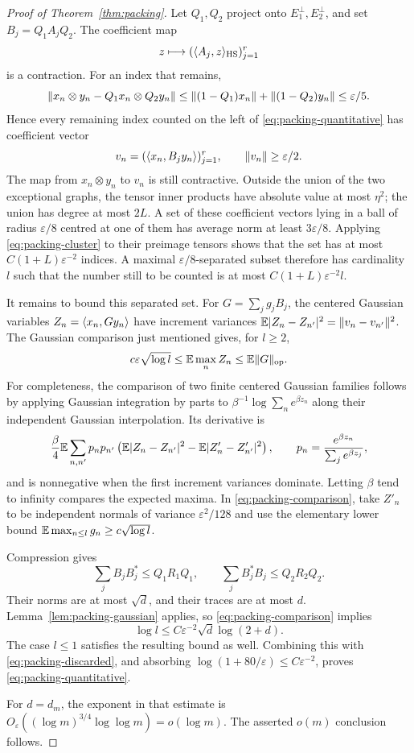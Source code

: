 \begin{proof}[Proof of Theorem~\ref{thm:packing}]
Let $Q_1,Q_2$ project onto $E_1^\perp,E_2^\perp$, and set
$B_j=Q_1A_jQ_2$.  The coefficient map
\[
 z\longmapsto (\langle A_j,z\rangle_{\rm HS})_{j=1}^r
\]
is a contraction.  For an index that remains,
\[
 \lVert x_n\otimes y_n-Q_1x_n\otimes Q_2y_n\rVert
   \le\lVert(1-Q_1)x_n\rVert+\lVert(1-Q_2)y_n\rVert
   \le\varepsilon/5.
\]
Hence every remaining index counted on the left of
\eqref{eq:packing-quantitative} has coefficient vector
\[
                  v_n=(\langle x_n,B_jy_n\rangle)_{j=1}^r,
                  \qquad \lVert v_n\rVert\ge\varepsilon/2.
\]
The map from $x_n\otimes y_n$ to $v_n$ is still contractive.
Outside the union of the two exceptional graphs, the tensor inner
products have absolute value at most $\eta^2$; the union has degree at
most $2L$.  A set of these coefficient vectors lying in a ball of
radius $\varepsilon/8$ centred at one of them has average norm at
least $3\varepsilon/8$.  Applying \eqref{eq:packing-cluster} to their
preimage tensors shows that the set has at most
$C(1+L)\varepsilon^{-2}$ indices.  A maximal
$\varepsilon/8$-separated subset therefore has cardinality $l$ such
that the number still to be counted is at most
$C(1+L)\varepsilon^{-2}l$.

It remains to bound this separated set.  For
$G=\sum_jg_jB_j$, the centered Gaussian variables
$Z_n=\langle x_n,Gy_n\rangle$ have increment variances
$\mathbb E|Z_n-Z_{n'}|^2=\lVert v_n-v_{n'}\rVert^2$.
The Gaussian comparison just mentioned gives, for $l\ge2$,
\begin{equation}\label{eq:packing-comparison}
 c\varepsilon\sqrt{\log l}
                     \le\mathbb E\max_nZ_n\le\mathbb E\lVert G\rVert_{\rm op}.
\end{equation}
For completeness, the comparison of two finite centered Gaussian
families follows by applying Gaussian integration by parts to
$\beta^{-1}\log\sum_n e^{\beta z_n}$ along their independent Gaussian
interpolation.  Its derivative is
\[
 \frac\beta4\mathbb E\sum_{n,n'}p_np_{n'}
   \left(\mathbb E|Z_n-Z_{n'}|^2-\mathbb E|Z'_n-Z'_{n'}|^2\right),
 \qquad p_n=\frac{e^{\beta z_n}}{\sum_j e^{\beta z_j}},
\]
and is nonnegative when the first increment variances dominate.
Letting $\beta$ tend to infinity compares the expected maxima.
In \eqref{eq:packing-comparison}, take $Z'_n$ to be independent normals
of variance $\varepsilon^2/128$ and use the elementary lower bound
$\mathbb E\max_{n\le l}g_n\ge c\sqrt{\log l}$.

Compression gives
\[
 \sum_jB_jB_j^*\le Q_1R_1Q_1,\qquad
 \sum_jB_j^*B_j\le Q_2R_2Q_2.
\]
Their norms are at most $\sqrt d$, and their traces are at most $d$.
Lemma~\ref{lem:packing-gaussian} applies, so
\eqref{eq:packing-comparison} implies
\[
                   \log l\le C\varepsilon^{-2}\sqrt d\log(2+d).
\]
The case $l\le1$ satisfies the resulting bound as well.  Combining
this with \eqref{eq:packing-discarded}, and absorbing
$\log(1+80/\varepsilon)\le C\varepsilon^{-2}$, proves
\eqref{eq:packing-quantitative}.

For $d=d_m$, the exponent in that estimate is
$O_\varepsilon((\log m)^{3/4}\log\log m)=o(\log m)$.
The asserted $o(m)$ conclusion follows.
\end{proof}

